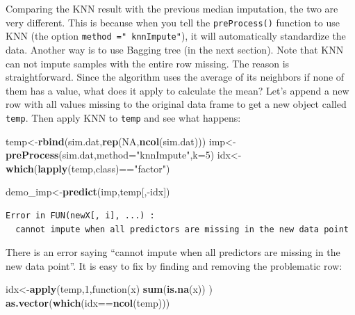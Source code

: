 \documentclass[12pt,]{krantz}
\newenvironment{Shaded}{\begin{snugshade}}{\end{snugshade}}
\newcommand{\KeywordTok}[1]{\textcolor[rgb]{0.13,0.29,0.53}{\textbf{{#1}}}}
\newcommand{\DataTypeTok}[1]{\textcolor[rgb]{0.13,0.29,0.53}{{#1}}}
\newcommand{\DecValTok}[1]{\textcolor[rgb]{0.00,0.00,0.81}{{#1}}}
\newcommand{\StringTok}[1]{\textcolor[rgb]{0.31,0.60,0.02}{{#1}}}
\newcommand{\OtherTok}[1]{\textcolor[rgb]{0.56,0.35,0.01}{{#1}}}
\newcommand{\NormalTok}[1]{{#1}}
\theoremstyle{definition}
\theoremstyle{definition}
\theoremstyle{remark}
\begin{document}
Comparing the KNN result with the previous median imputation, the two
are very different. This is because when you tell the
\texttt{preProcess()} function to use KNN (the option
\texttt{method\ ="\ knnImpute"}), it will automatically standardize the
data. Another way is to use Bagging tree (in the next section). Note
that KNN can not impute samples with the entire row missing. The reason
is straightforward. Since the algorithm uses the average of its
neighbors if none of them has a value, what does it apply to calculate
the mean? Let's append a new row with all values missing to the original
data frame to get a new object called \texttt{temp}. Then apply KNN to
\texttt{temp} and see what happens:

\begin{Shaded}
\begin{Highlighting}[]
\NormalTok{temp<-}\KeywordTok{rbind}\NormalTok{(sim.dat,}\KeywordTok{rep}\NormalTok{(}\OtherTok{NA}\NormalTok{,}\KeywordTok{ncol}\NormalTok{(sim.dat)))}
\NormalTok{imp<-}\KeywordTok{preProcess}\NormalTok{(sim.dat,}\DataTypeTok{method=}\StringTok{"knnImpute"}\NormalTok{,}\DataTypeTok{k=}\DecValTok{5}\NormalTok{)}
\NormalTok{idx<-}\KeywordTok{which}\NormalTok{(}\KeywordTok{lapply}\NormalTok{(temp,class)==}\StringTok{"factor"}\NormalTok{)}
\end{Highlighting}
\end{Shaded}

\begin{Shaded}
\begin{Highlighting}[]
\NormalTok{demo_imp<-}\KeywordTok{predict}\NormalTok{(imp,temp[,-idx])}
\end{Highlighting}
\end{Shaded}

\begin{verbatim}
Error in FUN(newX[, i], ...) : 
  cannot impute when all predictors are missing in the new data point
\end{verbatim}

There is an error saying ``cannot impute when all predictors are missing
in the new data point''. It is easy to fix by finding and removing the
problematic row:

\begin{Shaded}
\begin{Highlighting}[]
\NormalTok{idx<-}\KeywordTok{apply}\NormalTok{(temp,}\DecValTok{1}\NormalTok{,function(x) }\KeywordTok{sum}\NormalTok{(}\KeywordTok{is.na}\NormalTok{(x)) )}
\KeywordTok{as.vector}\NormalTok{(}\KeywordTok{which}\NormalTok{(idx==}\KeywordTok{ncol}\NormalTok{(temp)))}
\end{Highlighting}
\end{Shaded}
\end{document}
